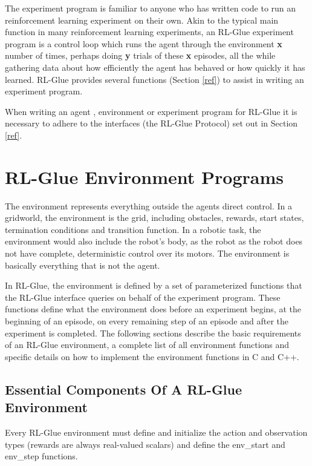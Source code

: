 \documentclass[11pt]{article}
\begin{document}
The experiment program is familiar to anyone who has written code to run an reinforcement learning experiment on their own. Akin to the typical main function in many reinforcement learning experiments, an RL-Glue experiment program is a control loop which runs the agent through the environment {\bf x} number of times, perhaps doing {\bf y} trials of these {\bf x} episodes, all the while gathering data about how efficiently the agent has behaved or how quickly it has learned. RL-Glue provides several functions (Section \ref{ref}) to assist in writing an experiment program.


When writing an agent , environment or experiment program for RL-Glue it is necessary to adhere to the interfaces (the RL-Glue Protocol) set out in Section \ref{ref}. 

\section{RL-Glue Environment Programs}
\label{env}
The environment represents everything outside the agents direct control. In a gridworld, the environment is the grid, including obstacles, rewards, start states, termination conditions and transition function. In a robotic task, the environment would also include the robot's body, as the robot as the robot does not have complete, deterministic control over its motors. The environment is basically everything that is not the agent.

In RL-Glue, the environment is defined by a set of parameterized functions that the RL-Glue interface queries on behalf of the experiment program. These functions define what the environment does before an experiment begins, at the beginning of an episode, on every remaining step of an episode and after the experiment is completed. The following sections describe the basic requirements of an RL-Glue environment, a complete list of all environment functions and specific details on how to implement the environment functions in C and C++.


\subsection{Essential Components Of A RL-Glue Environment}
\label{envp1}

Every RL-Glue environment must define and initialize the action and observation types (rewards are always real-valued scalars) and define the env\_start and env\_step functions.   
\end{document}
